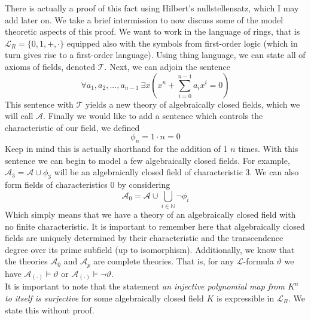 \documentclass[a4paper]{article}
\begin{document}
There is actually a proof of this fact using Hilbert's nullstellensatz, which I may add later on. We take a brief intermission to now discuss some of the model theoretic aspects of this proof. We want to work in the language of rings, that is $\mathcal{L}_{R} = \{0, 1, +, \cdot\}$ equipped also with the symbols from first-order logic (which in turn gives rise to a first-order language). Using thing language, we can state all of axioms of fields, denoted $\mathcal{T}$. Next, we can adjoin the sentence $$\forall a_1, a_2, ..., a_{n-1} ~ \exists x \left(x^n + \sum_{i=0}^{n-1} a_{i}x^{i} = 0\right)$$
This sentence with $\mathcal{T}$ yields a new theory of algebraically closed fields, which we will call $\mathcal{A}$. Finally we would like to add a sentence which controls the characteristic of our field, we defined $$\phi_{n} = 1 \cdot n= 0$$ Keep in mind this is actually shorthand for the addition of 1 $n$ times. With this sentence we can begin to model a few algebraically closed fields. For example, $\mathcal{A}_{3} = \mathcal{A} \cup \phi_{3}$ will be an algebraically closed field of characteristic 3. We can also form fields of characteristics 0 by considering $$\mathcal{A}_{0} = \mathcal{A} \cup \bigcup_{i \in \mathbb{N}} \lnot \phi_{i}$$
Which simply means that we have a theory of an algebraically closed field with no finite characteristic. It is important to remember here that algebraically closed fields are uniquely determined by their characteristic and the transcendence degree over its prime subfield (up to isomorphism). Additionally, we know that the theories $\mathcal{A}_{0}$ and $\mathcal{A}_{p}$ are complete theories. That is, for any $\mathcal{L}$-formula $\vartheta$ we have $\mathcal{A}_{(\cdot)} \models \vartheta$ or $\mathcal{A}_{(\cdot)} \models \lnot\vartheta$.\\

It is important to note that the statement \textit{an injective polynomial map from $K^n$ to itself is surjective} for some algebraically closed field $K$ is expressible in $\mathcal{L}_{R}$. We state this without proof.
\end{document}
